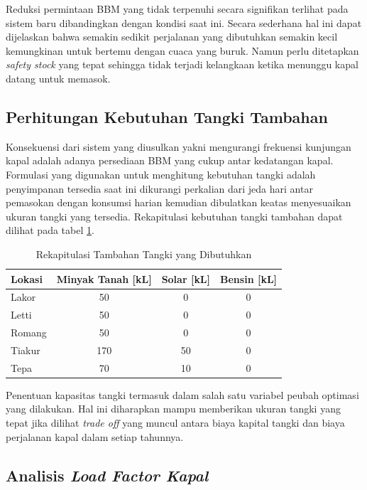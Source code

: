 Reduksi permintaan BBM yang tidak terpenuhi secara signifikan terlihat pada sistem baru dibandingkan dengan kondisi saat ini. Secara sederhana hal ini dapat dijelaskan bahwa semakin sedikit perjalanan yang dibutuhkan semakin kecil kemungkinan untuk bertemu dengan cuaca yang buruk. Namun perlu ditetapkan \emph{safety stock} yang tepat sehingga tidak terjadi kelangkaan ketika menunggu kapal datang untuk memasok.

\subsection{Perhitungan Kebutuhan Tangki Tambahan}
\label{subsec:hitungan-tangki}

Konsekuensi dari sistem yang diusulkan yakni mengurangi frekuensi kunjungan kapal adalah adanya persediaan BBM yang cukup antar kedatangan kapal. Formulasi yang digunakan untuk menghitung kebutuhan tangki adalah penyimpanan tersedia saat ini dikurangi perkalian dari jeda hari antar pemasokan dengan konsumsi harian kemudian dibulatkan keatas menyesuaikan ukuran tangki yang tersedia. Rekapitulasi kebutuhan tangki tambahan dapat dilihat pada tabel \ref{rekapitulasi-tambahan-tangki}.

\begin{table}[!htbp]
    \centering
    \caption{Rekapitulasi Tambahan Tangki yang Dibutuhkan}
    \begin{tabular}{|l|c|c|c|}
    \hline
        \textbf{Lokasi} & \textbf{Minyak Tanah [kL]} & \textbf{Solar [kL]} & \textbf{Bensin [kL]} \\ \hline
        Lakor & 50 & 0 & 0 \\ \hline
        Letti & 50 & 0 & 0 \\ \hline
        Romang & 50 & 0 & 0 \\ \hline
        Tiakur & 170 & 50 & 0 \\ \hline
        Tepa & 70 & 10 & 0 \\ \hline
    \end{tabular}
    \label{rekapitulasi-tambahan-tangki}
\end{table}

Penentuan kapasitas tangki termasuk dalam salah satu variabel peubah optimasi yang dilakukan. Hal ini diharapkan mampu memberikan ukuran tangki yang tepat jika dilihat \emph{trade off} yang muncul antara biaya kapital tangki dan biaya perjalanan kapal dalam setiap tahunnya.

\subsection{Analisis \emph{Load Factor Kapal}}
\label{subsec:load-factor-kapal}

